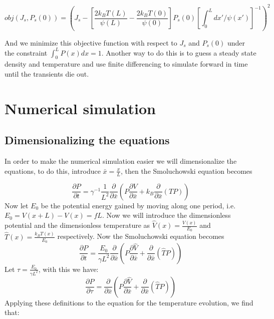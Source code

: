 \begin{equation}
obj(J_s, P_s(0)) = \left (J_s - \left [\frac{2 k_B T(L)}{\psi(L)} - \frac{2 k_B T(0)}{\psi(0)}  \right] P_s(0) \left [\int_0^L dx'/\psi(x') \right]^{-1} \right)^2  \label{eqn:Objective}
\end{equation}

And we minimize this objective function with respect to $J_s$ and $P_s(0)$ under the constraint $\int_0^L P(x) dx = 1$. Another way to do this is to guess a steady state density and temperature and use finite differencing to simulate forward in time until the transients die out.


\section{Numerical simulation} \label{numerics}

\subsection{Dimensionalizing the equations}

In order to make the numerical simulation easier we will dimensionalize the equations, to do this, introduce $\bar{x} = \frac{x}{L}$, then the Smoluchowski equation becomes

\begin{equation}
\frac{\partial P}{\partial t} = \gamma^{-1}\frac{1}{L^2} \frac{\partial}{\partial \bar{x}} \left (P \frac{\partial V}{\partial \bar{x}} + k_B \frac{\partial}{\partial \bar{x}}(TP) \right )
\end{equation}
Now let $E_0$ be the potential energy gained by moving along one period, i.e. $E_0 = V(x + L) - V(x) = f L$. Now we will introduce the dimensionless potential and the dimensionless temperature as $\hat{V}(x) = \frac{V(x)}{E_0}$ and $\hat{T}(x) = \frac{k_B T(x)}{E_0}$ respectively. Now the Smoluchowski equation becomes
\begin{equation}
\frac{\partial P}{\partial t} = \frac{E_0}{\gamma L^2} \frac{\partial}{\partial \bar{x}} \left (P \frac{\partial \hat{V}}{\partial \bar{x}} + \frac{\partial}{\partial \bar{x}}(\hat{T}P) \right )
\end{equation}
Let $\tau = \frac{E_0}{\gamma L^2}$, with this we have:
\begin{equation}
\frac{\partial P}{\partial \tau} = \frac{\partial}{\partial \bar{x}} \left (P \frac{\partial \hat{V}}{\partial \bar{x}} + \frac{\partial}{\partial \bar{x}}(\hat{T}P) \right )
\end{equation}
Applying these definitions to the equation for the temperature evolution, we find that:


